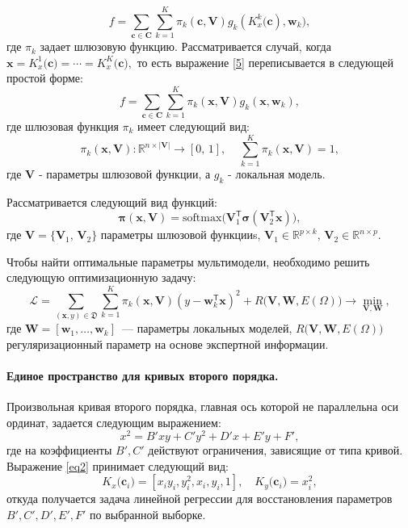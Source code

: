 \[
\label{5}
	f = \sum\limits_{\mathbf{c} \in \mathbf{C}} \sum_{k = 1}^{K} \pi_k(\mathbf{c}, \mathbf{V})g_k(K^k_{x}\bigl(\mathbf{c}), \mathbf{w}_k), 
\]
где $\pi_k$ задает шлюзовую функцию. Рассматривается случай, когда $\mathbf{x}=K^1_{x}\bigl(\mathbf{c})=\cdots=K^K_{x}\bigl(\mathbf{c}),$ то есть выражение \eqref{5} переписывается в следующей простой форме:
\[
\label{5_1}
	f = \sum\limits_{\mathbf{c} \in \mathbf{C}} \sum_{k = 1}^{K} \pi_k(\mathbf{x}, \mathbf{V})g_k(\mathbf{x}, \mathbf{w}_k), 
\]
где шлюзовая функция  $\pi_k$ имеет следующий вид:
\[
\label{6}
	\pi_k(\mathbf{x}, \mathbf{V}): \mathbb{R}^{n\times |\mathbf{V}|} \rightarrow [0, \, 1], \; \; \; \; \sum\limits_{k = 1}^{K}\pi_k(\mathbf{x}, \mathbf{V}) = 1,
\]
где $\mathbf{V}$ - параметры шлюзовой функции, а $ g_k $ - локальная модель.
    
Рассматривается следующий вид функций:
\[
    \boldsymbol{\pi}(\mathbf{x}, \mathbf{V}) = \text{softmax}\bigl(\mathbf{V}_1^{\mathsf{T}}\boldsymbol{\sigma}(\mathbf{V}_2^{\mathsf{T}}\mathbf{x}) \bigr),
\]
где $\mathbf{V} = \{ \mathbf{V}_1, \, \mathbf{V}_2\}$ параметры шлюзовой функцииs,
$\mathbf{V}_1 \in \mathbb{R}^{p \times k}, \, \mathbf{V}_2 \in \mathbb{R}^{n \times p}$. 

Чтобы найти оптимальные параметры мультимодели, необходимо решить следующую оптимизационную задачу:
\[\label{9}
\mathcal{L} = \sum\limits_{(\mathbf{x}, y) \in \mathfrak{D}} \sum\limits_{k = 1}^{K} \pi_k(\mathbf{x}, \mathbf{V})(y - \mathbf{w}_k^{\mathsf{T}}\mathbf{x})^2 + R\bigl(\mathbf{V}, \mathbf{W}, E(\Omega)\bigr) \rightarrow \min_{\mathbf{V}, \mathbf{W}},
\]
где $\mathbf{W} = [\mathbf{w}_1, \dots, \mathbf{w}_k]$~--- параметры локальных моделей, $R\bigl(\mathbf{V}, \mathbf{W}, E(\Omega)\bigr)$ регуляризационный параметр на основе экспертной информации.

\paragraph{Единое пространство для кривых второго порядка.} Произвольная кривая второго порядка, главная ось которой не параллельна оси ординат, задается следующим выражением:
\[
\label{st:coef}
x^2 = B'xy+C'y^2+D'x+E'y+F',
\]
где на коэффициенты $B', C'$ действуют ограничения, зависящие от типа кривой. Выражение \eqref{eq2} принимает следующий вид:
\[
\label{st:K_map}
K_x\bigr(\mathbf{c}_i\bigr)=\left[x_iy_i, y_i^2, x_i, y_i, 1\right], \quad K_y\bigr(\mathbf{c}_i\bigr)=x_i^2,
\]
откуда получается задача линейной регрессии для восстановления параметров $B', C', D', E', F'$ по выбранной выборке.

